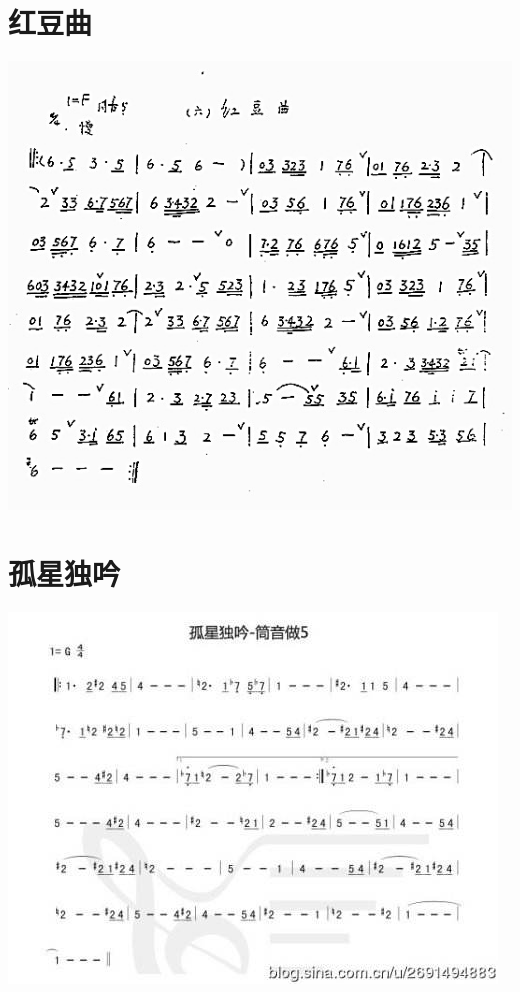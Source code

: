 \documentclass[cn,pad,chinese,chinesefont=nofont]{elegantbook}
\begin{document}
\section{红豆曲}
    \includegraphics[width=\textwidth]{dongxiao/红豆曲.jpg}
\section{孤星独吟}
    \includegraphics[width=\textwidth]{dongxiao/孤星独吟.jpg}
\end{document}
